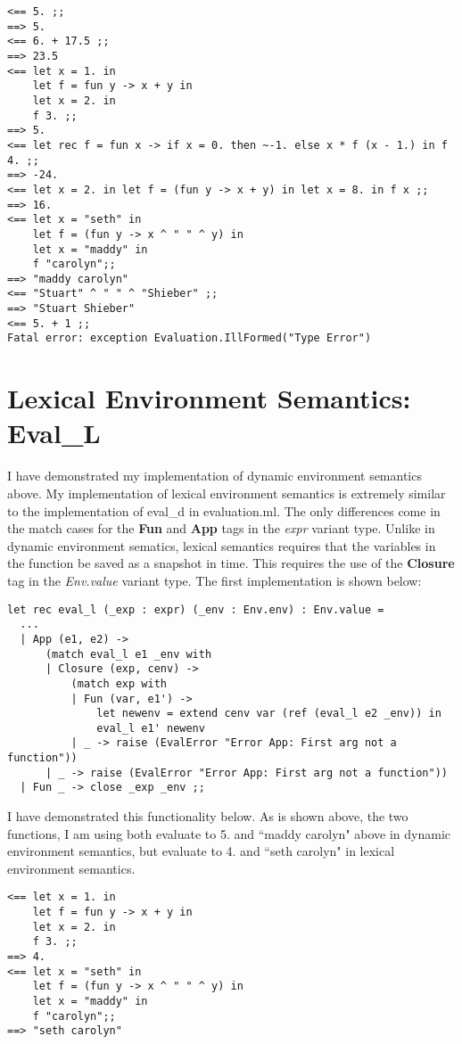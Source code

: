 \documentclass[12pt]{article}
\theoremstyle{definition}
\begin{document}
\begin{verbatim}
<== 5. ;; 
==> 5.
<== 6. + 17.5 ;;
==> 23.5
<== let x = 1. in 
	let f = fun y -> x + y in
	let x = 2. in
	f 3. ;; 
==> 5.
<== let rec f = fun x -> if x = 0. then ~-1. else x * f (x - 1.) in f 4. ;;
==> -24.
<== let x = 2. in let f = (fun y -> x + y) in let x = 8. in f x ;;
==> 16.
<== let x = "seth" in 
	let f = (fun y -> x ^ " " ^ y) in 
	let x = "maddy" in 
	f "carolyn";;
==> "maddy carolyn"
<== "Stuart" ^ " " ^ "Shieber" ;;
==> "Stuart Shieber"
<== 5. + 1 ;;
Fatal error: exception Evaluation.IllFormed("Type Error")
\end{verbatim}

\section{Lexical Environment Semantics: Eval\_L}

I have demonstrated my implementation of dynamic environment semantics above. My implementation of lexical environment semantics is extremely similar to the implementation of eval\_d in evaluation.ml. The only differences come in the match cases for the \textbf{Fun} and \textbf{App} tags in the \textit{expr} variant type. Unlike in dynamic environment sematics, lexical semantics requires that the variables in the function be saved as a snapshot in time. This requires the use of the \textbf{Closure} tag in the \textit{Env.value} variant type. The first implementation is shown below: 

\begin{verbatim}
let rec eval_l (_exp : expr) (_env : Env.env) : Env.value =
  ...
  | App (e1, e2) -> 
      (match eval_l e1 _env with 
      | Closure (exp, cenv) ->
          (match exp with 
          | Fun (var, e1') -> 
              let newenv = extend cenv var (ref (eval_l e2 _env)) in
              eval_l e1' newenv 
          | _ -> raise (EvalError "Error App: First arg not a function"))
      | _ -> raise (EvalError "Error App: First arg not a function"))
  | Fun _ -> close _exp _env ;;
\end{verbatim}

I have demonstrated this functionality below. As is shown above, the two functions, I am using both evaluate to 5. and ``maddy carolyn" above in dynamic environment semantics, but evaluate to 4. and ``seth carolyn" in lexical environment semantics. 

\begin{verbatim}
<== let x = 1. in 
	let f = fun y -> x + y in
	let x = 2. in
	f 3. ;;
==> 4.
<== let x = "seth" in 
	let f = (fun y -> x ^ " " ^ y) in 
	let x = "maddy" in 
	f "carolyn";;
==> "seth carolyn"
\end{verbatim}
\end{document}
